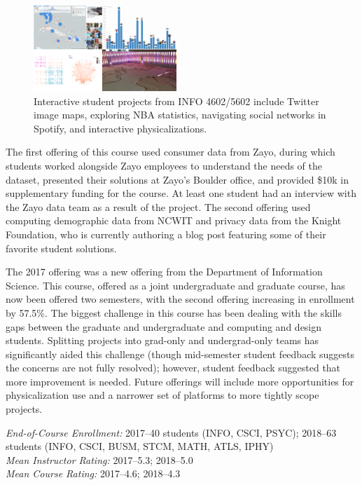 \documentclass[11pt]{article}
\begin{document}
\begin{figure}
	\begin{center}
		\includegraphics[width=0.48\textwidth]{FlyerImage}
	\end{center}
	\caption{Interactive student projects from INFO 4602/5602 include Twitter image maps, exploring NBA statistics, navigating social networks in Spotify, and interactive physicalizations.}
\end{figure}

The first offering of this course used consumer data from Zayo, during which students worked alongside Zayo employees to understand the needs of the dataset, presented their solutions at Zayo's Boulder office, and provided \$10k in supplementary funding for the course. At least one student had an interview with the Zayo data team as a result of the project. The second offering used computing demographic data from NCWIT and privacy data from the Knight Foundation, who is currently authoring a blog post featuring some of their favorite student solutions. 

The 2017 offering was a new offering from the Department of Information Science. 
This course, offered as a joint undergraduate and graduate course, has now been offered two semesters, with the second offering increasing in enrollment by 57.5\%. The biggest challenge in this course has been dealing with the skills gaps between the graduate and undergraduate and computing and design students. Splitting projects into grad-only and undergrad-only teams has significantly aided this challenge (though mid-semester student feedback suggests the concerns are not fully resolved); however, student feedback suggested that more improvement is needed. Future offerings will include more opportunities for physicalization use and a narrower set of platforms to more tightly scope projects.

\emph{End-of-Course Enrollment: }2017--40 students (INFO, CSCI, PSYC); 2018--63 students (INFO, CSCI, BUSM, STCM, MATH, ATLS, IPHY)\\
\emph{Mean Instructor Rating:} 2017--5.3; 2018--5.0\\
\emph{Mean Course Rating:} 2017--4.6; 2018--4.3
\end{document}
